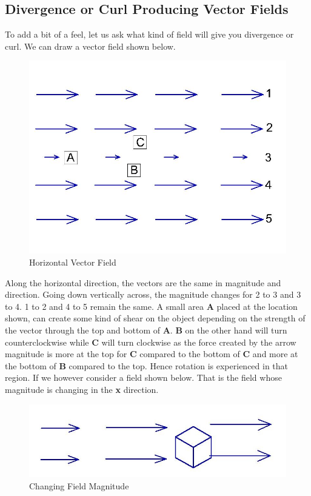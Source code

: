 \subsection{Divergence or Curl Producing Vector Fields}
To add a bit of a feel, let us ask what kind of field will give you divergence or curl. We can draw a vector field shown below.
\begin{figure}[h]
\centering
\includegraphics[width=1\linewidth]{graphics/fig171}
\caption{Horizontal Vector Field}
\end{figure}

Along the horizontal direction, the vectors are the same in magnitude and direction. Going down vertically across, the magnitude changes for 2 to 3 and 3 to 4. 1 to 2 and 4 to 5 remain the same. A small area \textbf{A} placed at the location shown, can create some kind of shear on the object depending on the strength of the vector through the top and bottom of \textbf{A}. \textbf{B} on the other hand will turn counterclockwise while \textbf{C} will turn clockwise as the force created by the arrow magnitude is more at the top for \textbf{C} compared to the bottom of \textbf{C} and more at the bottom of \textbf{B} compared to the top. Hence rotation is experienced in that region. If we however consider a field shown below. That is the field whose magnitude is changing in the \textbf{x} direction.
\begin{figure}[h]
\centering
\includegraphics[width=1\linewidth]{graphics/fig172}
\caption{Changing Field Magnitude}
\end{figure}

